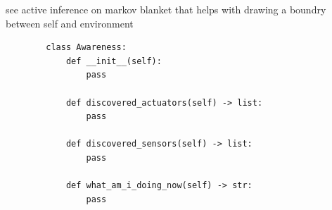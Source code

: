 \documentclass[a4paper]{article}
\title{}
\date{}
\begin{document}
    \maketitle
    see active inference on markov blanket that helps with drawing a boundry between self and environment
    
    \begin{verbatim}
        class Awareness:
            def __init__(self):
                pass
            
            def discovered_actuators(self) -> list:
                pass
            
            def discovered_sensors(self) -> list:
                pass
            
            def what_am_i_doing_now(self) -> str:
                pass
    \end{verbatim}
    
\end{document}
